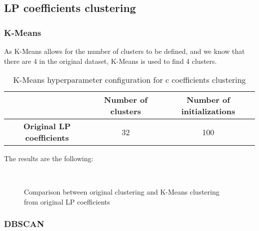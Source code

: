 	\subsection{LP coefficients clustering}

		\subsubsection{K-Means}
			
			As K-Means allows for the number of clusters to be defined, and we know that there are 4 in the original dataset, K-Means is used to find 4 clusters.
			
			\begin{table}[h!]
				\centering
				\begin{tabular}{|c|c|c|}
					\hline
					& \textbf{Number of clusters} & \textbf{Number of initializations}\\
					\hline
					\textbf{Original LP coefficients} & 32 & 100\\
					\hline
				\end{tabular}
				\caption{K-Means hyperparameter configuration for c coefficients clustering}
			\end{table}
		
			The results are the following:
			
			\begin{figure*}[ht!]
				\centering
				\hspace{\fill}
				\\
					
				\hspace{\fill}
				\caption{Comparison between original clustering and K-Means clustering from original LP coefficients}
			\end{figure*}
			\FloatBarrier
		
		\subsubsection{DBSCAN}
			
